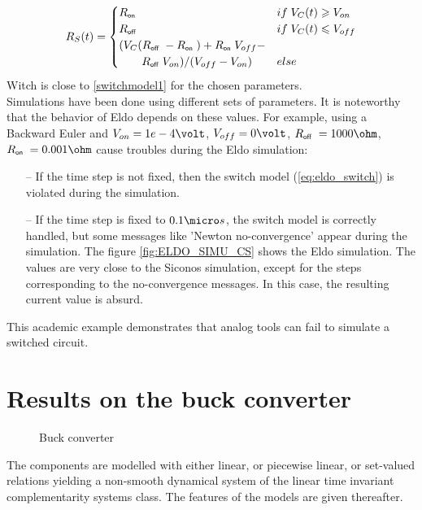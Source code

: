   \begin{equation}
    \label{eq:eldo_switch}
    R_S(t)=\begin{cases}R_\on\; & \mbox{if}\;V_{C}(t) \geq V_{on} \\   R_\off\;  & \mbox{if}\;V_{C}(t) \leq
    V_{off} \\ (V_{C}(R_\off\;-R_\on\;)+ R_\on\; V_{off}- \\ \qquad R_\off\;V_{on})/(V_{off}-V_{on})& \mbox{else}\; \end{cases}
  \end{equation}
  Witch is close to \ref{switchmodel1} for the chosen parameters. \\Simulations have been done using
  different sets of parameters. It is noteworthy that the
behavior of {\sc Eldo} depends on these values. For example, using a Backward Euler and $V_{on}=1e-4
\volt$, $V_{off}=0 \volt$,
$R_\off\; = 1000 \ohm$, $R_\on\;=0.001\ohm$ cause troubles during the {\sc Eldo}
simulation:
\begin{enumerate}
\item [--] If the time step is not fixed, then the switch model (\ref{eq:eldo_switch}) is violated during the
  simulation.
  \item[--] If the time step is fixed to $0.1 \micro s$, the switch model is correctly handled, but
  some messages like 'Newton no-convergence' appear during the simulation. The figure \ref{fig:ELDO_SIMU_CS}
  shows the {\sc Eldo} simulation. The values are very close to the {\sc Siconos} simulation, except for the steps corresponding to the
  no-convergence messages. In this case, the resulting current value is absurd. 
\end{enumerate}


This academic example demonstrates that analog tools can fail to simulate a switched circuit.

\section{Results on the buck converter}
\label{section4}


\begin{figure}[!ht]
\centerline{
 \scalebox{1.0}{
    
 }
}
\caption{Buck converter}
\label{fig-Buck-converter}
\end{figure}
The components are modelled with either linear, or piecewise linear, or set-valued relations yielding a non-smooth dynamical system of the linear time invariant complementarity systems class. The features of the models are given thereafter.

